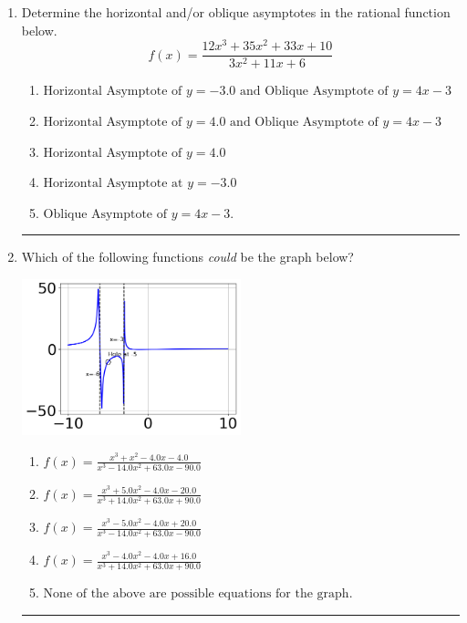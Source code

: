 \documentclass[14pt]{extbook}
\newcommand{\litem}[1]{\item#1\hspace*{-1cm}\rule{\textwidth}{0.4pt}}
\begin{document}
\begin{enumerate}
\litem{
Determine the horizontal and/or oblique asymptotes in the rational function below.\[ f(x) = \frac{12x^{3} +35 x^{2} +33 x + 10}{3x^{2} +11 x + 6} \]\begin{enumerate}[label=\Alph*.]
\item \( \text{Horizontal Asymptote of } y = -3.0 \text{ and Oblique Asymptote of } y = 4x -3 \)
\item \( \text{Horizontal Asymptote of } y = 4.0 \text{ and Oblique Asymptote of } y = 4x -3 \)
\item \( \text{Horizontal Asymptote of } y = 4.0  \)
\item \( \text{Horizontal Asymptote at } y = -3.0 \)
\item \( \text{Oblique Asymptote of } y = 4x -3. \)

\end{enumerate} }
\litem{
Which of the following functions \textit{could} be the graph below?
\begin{center}
    \includegraphics[width=0.5\textwidth]{../Figures/identifyGraphOfRationalFunctionCopyB.png}
\end{center}
\begin{enumerate}[label=\Alph*.]
\item \( f(x)=\frac{x^{3} + x^{2} -4.0 x -4.0}{x^{3} -14.0 x^{2} +63.0 x -90.0} \)
\item \( f(x)=\frac{x^{3} +5.0 x^{2} -4.0 x -20.0}{x^{3} +14.0 x^{2} +63.0 x + 90.0} \)
\item \( f(x)=\frac{x^{3} -5.0 x^{2} -4.0 x + 20.0}{x^{3} -14.0 x^{2} +63.0 x -90.0} \)
\item \( f(x)=\frac{x^{3} -4.0 x^{2} -4.0 x + 16.0}{x^{3} +14.0 x^{2} +63.0 x + 90.0} \)
\item \( \text{None of the above are possible equations for the graph.} \)


\end{enumerate}}
\end{enumerate}
\end{document}
